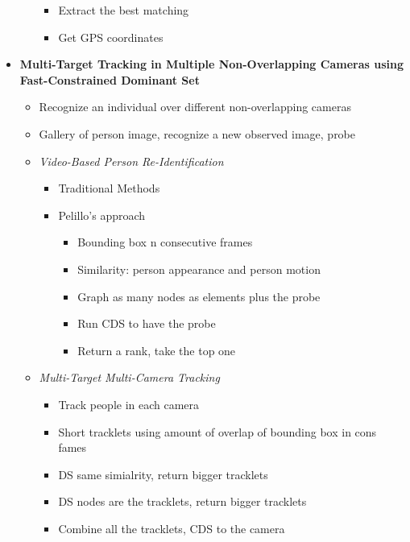 \documentclass[12pt,oneside]{report}
\begin{document}
\begin{itemize}
\begin{itemize}
\begin{itemize}
            \item Extract the best matching
            \item Get GPS coordinates
        \end{itemize}
    \end{itemize}
    \item \textbf{Multi-Target Tracking in Multiple Non-Overlapping Cameras using Fast-Constrained Dominant Set}
    \begin{itemize}
        \item Recognize an individual over different non-overlapping cameras
        \item Gallery of person image, recognize a new observed image, probe
        \item \textit{Video-Based Person Re-Identification}
        \begin{itemize}
            \item Traditional Methods
            \item Pelillo's approach
            \begin{itemize}
                \item Bounding box n consecutive frames
                \item Similarity: person appearance and person motion
                \item Graph as many nodes as elements plus the probe
                \item Run CDS to have the probe
                \item Return a rank, take the top one
            \end{itemize}
        \end{itemize}
        \item \textit{Multi-Target Multi-Camera Tracking}
        \begin{itemize}
            \item Track people in each camera
            \item Short tracklets using amount of overlap of bounding box in cons fames
            \item DS same simialrity, return bigger tracklets
            \item DS nodes are the tracklets, return bigger tracklets
            \item Combine all the tracklets, CDS to the camera
        \end{itemize}
    \end{itemize}
\end{itemize}
\end{document}
